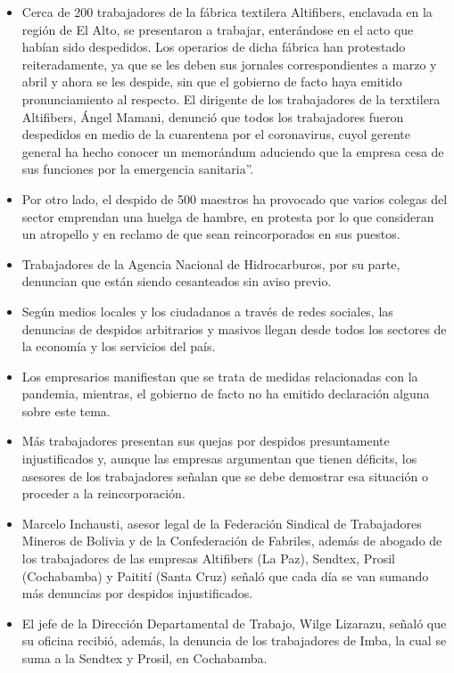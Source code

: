 \documentclass[a4paper, nobind]{templates/ociamthesis}
\begin{document}
\begin{itemize}
\item
  Cerca de 200 trabajadores de la fábrica textilera Altifibers, enclavada en la región de El Alto, se presentaron a trabajar, enterándose en el acto que habían sido despedidos. Los operarios de dicha fábrica han protestado reiteradamente, ya que se les deben sus jornales correspondientes a marzo y abril y ahora se les despide, sin que el gobierno de facto haya emitido pronunciamiento al respecto. El dirigente de los trabajadores de la terxtilera Altifibers, Ángel Mamani, denunció que todos los trabajadores fueron despedidos en medio de la cuarentena por el coronavirus, cuyol gerente general ha hecho conocer un memorándum aduciendo que la empresa cesa de sus funciones por la emergencia sanitaria''.
\item
  Por otro lado, el despido de 500 maestros ha provocado que varios colegas del sector emprendan una huelga de hambre, en protesta por lo que consideran un atropello y en reclamo de que sean reincorporados en sus puestos.
\item
  Trabajadores de la Agencia Nacional de Hidrocarburos, por su parte, denuncian que están siendo cesanteados sin aviso previo.
\item
  Según medios locales y los ciudadanos a través de redes sociales, las denuncias de despidos arbitrarios y masivos llegan desde todos los sectores de la economía y los servicios del país.
\item
  Los empresarios manifiestan que se trata de medidas relacionadas con la pandemia, mientras, el gobierno de facto no ha emitido declaración alguna sobre este tema.
\item
  Más trabajadores presentan sus quejas por despidos presuntamente injustificados y, aunque las empresas argumentan que tienen déficits, los asesores de los trabajadores señalan que se debe demostrar esa situación o proceder a la reincorporación.
\item
  Marcelo Inchausti, asesor legal de la Federación Sindical de Trabajadores Mineros de Bolivia y de la Confederación de Fabriles, además de abogado de los trabajadores de las empresas Altifibers (La Paz), Sendtex, Prosil (Cochabamba) y Paitití (Santa Cruz) señaló que cada día se van sumando más denuncias por despidos injustificados.
\item
  El jefe de la Dirección Departamental de Trabajo, Wilge Lizarazu, señaló que su oficina recibió, además, la denuncia de los trabajadores de Imba, la cual se suma a la Sendtex y Prosil, en Cochabamba.

\end{itemize}
\end{document}
